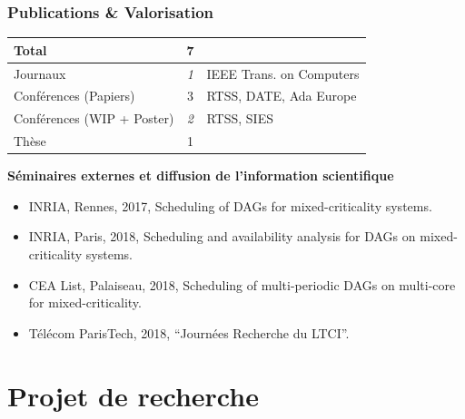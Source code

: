 \documentclass[xcolor=table]{beamer}
\begin{document}
\begin{frame}
	\frametitle{Publications \& Valorisation}
	\begin{table}[]
		\begin{tabular}{|l|c|l|}
			\hline
			\rowcolor[HTML]{DAE8FC} 
			Total                      & 7          &                          \\ \hline
			Journaux                   & \textit{1} & IEEE Trans. on Computers \\ \hline
			Conférences (Papiers)      & 3          & RTSS, DATE, Ada Europe   \\ \hline
			Conférences (WIP + Poster) & \textit{2} & RTSS, SIES               \\ \hline
			Thèse                      & 1          &                          \\ \hline
		\end{tabular}
	\end{table}
	\textbf{Séminaires externes et diffusion de l'information scientifique}
	\begin{itemize}
        \item INRIA, Rennes, 2017, Scheduling of DAGs for mixed-criticality systems.
		\item INRIA, Paris, 2018, Scheduling and availability analysis for DAGs on 
		mixed-criticality systems.
		\item CEA List, Palaiseau, 2018, Scheduling of multi-periodic DAGs on 
		multi-core for mixed-criticality.
		\item T\'{e}l\'{e}com ParisTech, 2018, ``Journ\'{e}es Recherche du LTCI''.
	\end{itemize}
\end{frame}

\section{Projet de recherche}
\end{document}
